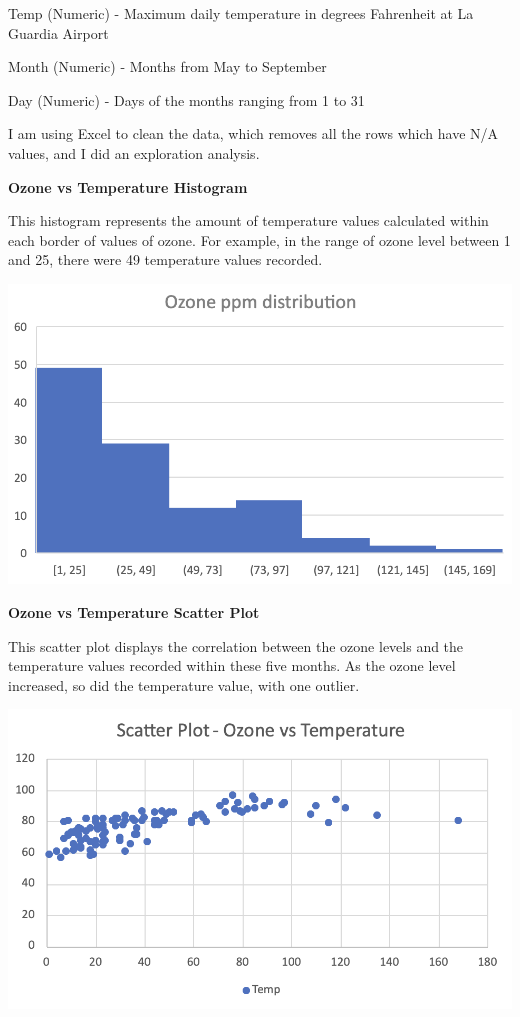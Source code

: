 \documentclass[
  letterpaper,
  DIV=11,
  numbers=noendperiod]{scrreprt}
\begin{document}
Temp (Numeric) - Maximum daily temperature in degrees Fahrenheit at La
Guardia Airport

Month (Numeric) - Months from May to September

Day (Numeric) - Days of the months ranging from 1 to 31

I am using Excel to clean the data, which removes all the rows which
have N/A values, and I did an exploration analysis.

\textbf{Ozone vs Temperature Histogram}

This histogram represents the amount of temperature values calculated
within each border of values of ozone. For example, in the range of
ozone level between 1 and 25, there were 49 temperature values recorded.

\includegraphics{Hist_Ozone_Pena.png}

\textbf{Ozone vs Temperature Scatter Plot}

This scatter plot displays the correlation between the ozone levels and
the temperature values recorded within these five months. As the ozone
level increased, so did the temperature value, with one outlier.

\includegraphics{Scat_Oz_Temp_Pena.png}
\end{document}
